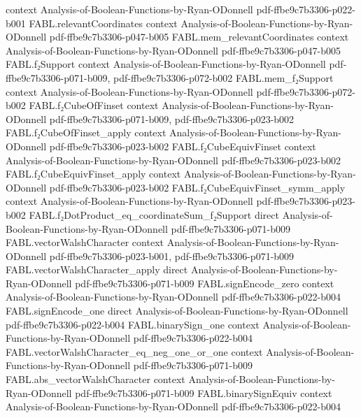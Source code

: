 \begin{theorem}
  {context}
  {Analysis-of-Boolean-Functions-by-Ryan-ODonnell}
  {pdf-ffbe9c7b3306-p022-b001}
\proofstep
  {FABL.relevantCoordinates}
  {context}
  {Analysis-of-Boolean-Functions-by-Ryan-ODonnell}
  {pdf-ffbe9c7b3306-p047-b005}
\proofstep
  {FABL.mem_relevantCoordinates}
  {context}
  {Analysis-of-Boolean-Functions-by-Ryan-ODonnell}
  {pdf-ffbe9c7b3306-p047-b005}
\proofstep
  {FABL.f₂Support}
  {context}
  {Analysis-of-Boolean-Functions-by-Ryan-ODonnell}
  {pdf-ffbe9c7b3306-p071-b009,
    pdf-ffbe9c7b3306-p072-b002}
\proofstep
  {FABL.mem_f₂Support}
  {context}
  {Analysis-of-Boolean-Functions-by-Ryan-ODonnell}
  {pdf-ffbe9c7b3306-p072-b002}
\proofstep
  {FABL.f₂CubeOfFinset}
  {context}
  {Analysis-of-Boolean-Functions-by-Ryan-ODonnell}
  {pdf-ffbe9c7b3306-p071-b009,
    pdf-ffbe9c7b3306-p023-b002}
\proofstep
  {FABL.f₂CubeOfFinset_apply}
  {context}
  {Analysis-of-Boolean-Functions-by-Ryan-ODonnell}
  {pdf-ffbe9c7b3306-p023-b002}
\proofstep
  {FABL.f₂CubeEquivFinset}
  {context}
  {Analysis-of-Boolean-Functions-by-Ryan-ODonnell}
  {pdf-ffbe9c7b3306-p023-b002}
\proofstep
  {FABL.f₂CubeEquivFinset_apply}
  {context}
  {Analysis-of-Boolean-Functions-by-Ryan-ODonnell}
  {pdf-ffbe9c7b3306-p023-b002}
\proofstep
  {FABL.f₂CubeEquivFinset_symm_apply}
  {context}
  {Analysis-of-Boolean-Functions-by-Ryan-ODonnell}
  {pdf-ffbe9c7b3306-p023-b002}
\proofstep
  {FABL.f₂DotProduct_eq_coordinateSum_f₂Support}
  {direct}
  {Analysis-of-Boolean-Functions-by-Ryan-ODonnell}
  {pdf-ffbe9c7b3306-p071-b009}
\proofstep
  {FABL.vectorWalshCharacter}
  {context}
  {Analysis-of-Boolean-Functions-by-Ryan-ODonnell}
  {pdf-ffbe9c7b3306-p023-b001,
    pdf-ffbe9c7b3306-p071-b009}
\proofstep
  {FABL.vectorWalshCharacter_apply}
  {direct}
  {Analysis-of-Boolean-Functions-by-Ryan-ODonnell}
  {pdf-ffbe9c7b3306-p071-b009}
\proofstep
  {FABL.signEncode_zero}
  {context}
  {Analysis-of-Boolean-Functions-by-Ryan-ODonnell}
  {pdf-ffbe9c7b3306-p022-b004}
\proofstep
  {FABL.signEncode_one}
  {direct}
  {Analysis-of-Boolean-Functions-by-Ryan-ODonnell}
  {pdf-ffbe9c7b3306-p022-b004}
\proofstep
  {FABL.binarySign_one}
  {context}
  {Analysis-of-Boolean-Functions-by-Ryan-ODonnell}
  {pdf-ffbe9c7b3306-p022-b004}
\proofstep
  {FABL.vectorWalshCharacter_eq_neg_one_or_one}
  {context}
  {Analysis-of-Boolean-Functions-by-Ryan-ODonnell}
  {pdf-ffbe9c7b3306-p071-b009}
\proofstep
  {FABL.abs_vectorWalshCharacter}
  {context}
  {Analysis-of-Boolean-Functions-by-Ryan-ODonnell}
  {pdf-ffbe9c7b3306-p071-b009}
\proofstep
  {FABL.binarySignEquiv}
  {context}
  {Analysis-of-Boolean-Functions-by-Ryan-ODonnell}
  {pdf-ffbe9c7b3306-p022-b004}

\end{theorem}
